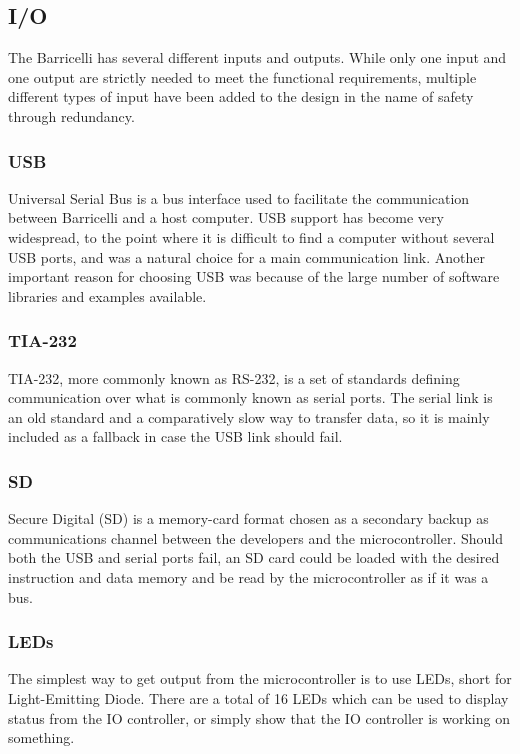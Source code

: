 \subsection{I/O}

The Barricelli has several different inputs and outputs.
While only one input and one output are strictly needed to meet the functional requirements, multiple different types of input have been added to the design in the name of safety through redundancy.

\subsubsection{USB}

Universal Serial Bus is a bus interface used to facilitate the communication between Barricelli and a host computer.
USB support has become very widespread, to the point where it is difficult to find a computer without several USB ports, and was a natural choice for a main communication link.
Another important reason for choosing USB was because of the large number of software libraries and examples available.

\subsubsection{TIA-232}

TIA-232, more commonly known as RS-232, is a set of standards defining communication over what is commonly known as serial ports.
The serial link is an old standard and a comparatively slow way to transfer data, so it is mainly included as a fallback in case the USB link should fail.

\subsubsection{SD}

Secure Digital (SD) is a memory-card format chosen as a secondary backup as communications channel between the developers and the microcontroller.
Should both the USB and serial ports fail, an SD card could be loaded with the desired instruction and data memory and be read by the microcontroller as if it was a bus.

\subsubsection{LEDs}

The simplest way to get output from the microcontroller is to use LEDs, short for Light-Emitting Diode.
There are a total of 16 LEDs which can be used to display status from the IO controller, or simply show that the IO controller is working on something.

